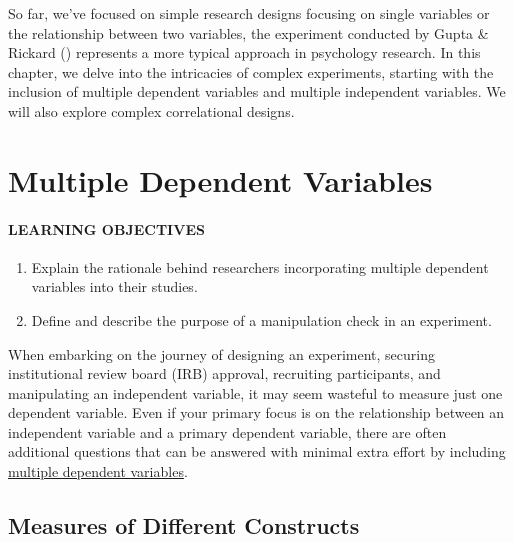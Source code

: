 \documentclass[
]{krantz}
\providecommand{\tightlist}{%
  \setlength{\itemsep}{0pt}\setlength{\parskip}{0pt}}
\begin{document}
So far, we've focused on simple research designs focusing on single variables or the relationship between two variables, the experiment conducted by Gupta \& Rickard () represents a more typical approach in psychology research. In this chapter, we delve into the intricacies of complex experiments, starting with the inclusion of multiple dependent variables and multiple independent variables. We will also explore complex correlational designs.

\section{Multiple Dependent Variables}\label{multiple-dependent-variables}

\paragraph*{LEARNING OBJECTIVES}\label{learning-objectives-14}

\begin{enumerate}
\def\labelenumi{\arabic{enumi}.}
\tightlist
\item
  Explain the rationale behind researchers incorporating multiple dependent variables into their studies.
\item
  Define and describe the purpose of a manipulation check in an experiment.
\end{enumerate}

When embarking on the journey of designing an experiment, securing institutional review board (IRB) approval, recruiting participants, and manipulating an independent variable, it may seem wasteful to measure just one dependent variable. Even if your primary focus is on the relationship between an independent variable and a primary dependent variable, there are often additional questions that can be answered with minimal extra effort by including \hyperref[multiple-dependent-variables]{multiple dependent variables}.

\subsection*{Measures of Different Constructs}\label{measures-of-different-constructs}
\end{document}
